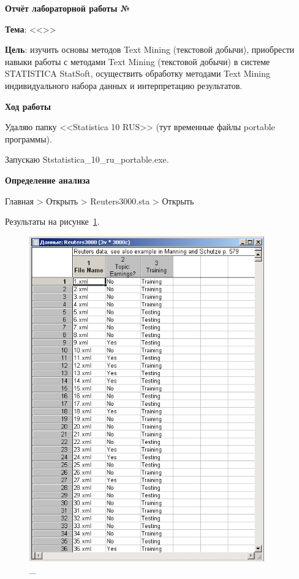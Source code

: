 \begin{center}
  \textbf{Отчёт лабораторной работы №\envReportLabNumber}
\end{center}

\textbf{Тема}:
<<\envReportTitle>>

\textbf{Цель}:
изучить основы методов Text Mining (текстовой добычи), приобрести
навыки работы с методами Text Mining (текстовой добычи) в системе
STATISTICA StatSoft, осуществить обработку методами Text Mining
индивидуального набора данных и интерпретацию результатов.

\begin{center}
  \textbf{Ход работы}
\end{center}

Удаляю папку <<Statistica 10 RUS>> (тут временные файлы portable программы).

Запускаю Ststatistica\_10\_ru\_portable.exe.

\begin{center}
  \textbf{Определение анализа}
\end{center}

Главная > Открыть > Reuters3000.sta  > Открыть

Результаты на рисунке~\ref{fig:1}.

\begin{figure}[!h]
  \centering

  \includegraphics[height=14cm]
  {inc/1.PNG}

  \caption{\_}

  \label{fig:1}
\end{figure}

